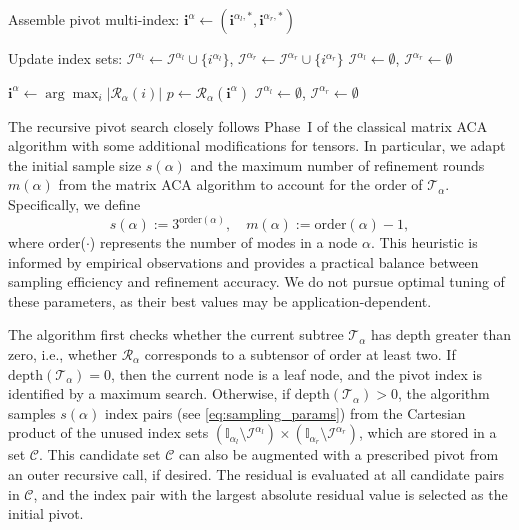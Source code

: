 \documentclass{article}
\theoremstyle{plain}
\theoremstyle{definition}
\theoremstyle{remark}
\begin{document}
\begin{algorithm}[htb]
\begin{algorithmic}[1]
  \State Assemble pivot multi-index:
  $\bm{i}^\alpha \gets (\bm{i}^{\alpha_l,*}, \bm{i}^{\alpha_r,*})$

    \State Update index sets:
    $\mathcal{I}^{\alpha_l}\gets\mathcal{I}^{\alpha_l}\cup\{i^{\alpha_l}\}$,
    $\mathcal{I}^{\alpha_r}\gets\mathcal{I}^{\alpha_r}\cup\{i^{\alpha_r}\}$
  \Else
    \State $\mathcal{I}^{\alpha_l}\gets\emptyset$, $\mathcal{I}^{\alpha_r}\gets\emptyset$
  \EndIf

\Else
  \State $\bm{i}^\alpha \gets \arg\max_i |\mathcal{R}_\alpha(i)|$
  \State $p \gets \mathcal{R}_\alpha(\bm{i}^\alpha)$
  \State $\mathcal{I}^{\alpha_l}\gets\emptyset$, $\mathcal{I}^{\alpha_r}\gets\emptyset$
\EndIf

\end{algorithmic}
\end{algorithm}

The recursive pivot search closely follows Phase~I of the classical matrix ACA algorithm with some additional modifications for tensors. In particular, we adapt the initial sample size \( s(\alpha) \) and the maximum number of refinement rounds \(m(\alpha)\) from the matrix ACA algorithm to account for the order of \(\mathcal{T}_{\alpha}\). Specifically, we define
\begin{equation}
    s(\alpha) := 3^{\text{order}(\alpha)}, \quad m(\alpha) := \text{order}(\alpha) - 1, \label{eq:sampling_params}
\end{equation}
where order($\cdot$) represents the number of modes in a node $\alpha$. This heuristic is informed by empirical observations and provides a practical balance between sampling efficiency and refinement accuracy. We do not pursue optimal tuning of these parameters, as their best values may be application-dependent.

The algorithm first checks whether the current subtree $\mathcal{T}_{\alpha}$ has depth greater than zero, i.e., whether $\mathcal{R}_{\alpha}$ corresponds to a subtensor of order at least two. If $\text{depth}(\mathcal{T}_\alpha) = 0$, then the current node is a leaf node, and the pivot index is identified by a maximum search. Otherwise, if $\text{depth}(\mathcal{T}_\alpha) > 0$, the algorithm samples $s(\alpha)$ index pairs (see \eqref{eq:sampling_params}) from the Cartesian product of the unused index sets $(\mathbb{I}_{\alpha_l}\setminus \mathcal{I}^{\alpha_l}) \times (\mathbb{I}_{\alpha_r}\setminus \mathcal{I}^{\alpha_r})$, which are stored in a set $\mathcal{C}$. This candidate set $\mathcal{C}$ can also be augmented with a prescribed pivot from an outer recursive call, if desired. The residual is evaluated at all candidate pairs in $\mathcal{C}$, and the index pair with the largest absolute residual value is selected as the initial pivot.
\end{document}
